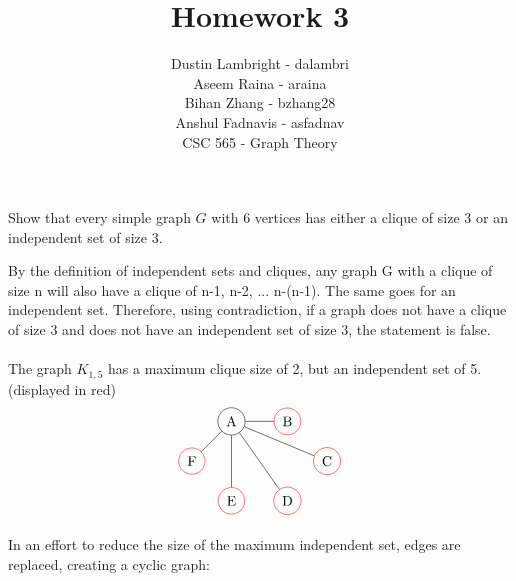 \documentclass[12pt]{article}
\newenvironment{question}[2][Question]{\begin{trivlist}
\item[\hskip \labelsep {\bfseries #1}\hskip \labelsep {\bfseries #2.}]}{\end{trivlist}}
\begin{document}


\title{Homework 3}%
\author{Dustin Lambright - dalambri \\ Aseem Raina - araina \\ Bihan Zhang - bzhang28 \\ Anshul Fadnavis - asfadnav\\
CSC 565 - Graph Theory} %

\maketitle


\begin{question}{1}
Show that every simple graph $G$ with 6 vertices has either a clique of size 3 or an independent
set of size 3.
\end{question}

By the definition of independent sets and cliques, any graph G with a clique of size n will also have a clique of n-1, n-2, ... n-(n-1).  The same goes for an independent set.  Therefore, using contradiction, if a graph does not have a clique of size 3 and does not have an independent set of size 3, the statement is false. \\ \\

The graph $K_{1,5}$ has a maximum clique size of 2, but an independent set of 5. (displayed in red)
\begin{align*}
\begin{tikzpicture}
\node[shape=circle,draw=black] (A) at (1,2) {A};
\node[shape=circle,draw=red] (B) at (2.4142857,2) {B};
\node[shape=circle,draw=red] (C) at (3.4142856,1) {C};
\node[shape=circle,draw=red] (D) at (2.4142857,0) {D};
\node[shape=circle,draw=red] (E) at (1,0) {E};
\node[shape=circle,draw=red] (F) at (0,1) {F};
\path [] (A) edge node[left] {} (B);
\path [] (A) edge node[left] {} (C);
\path [] (A) edge node[left] {} (D);
\path [] (A) edge node[left] {} (E);
\path [] (A) edge node[left] {} (F);
\end{tikzpicture}
\end{align*}

In an effort to reduce the size of the maximum independent set, edges are replaced, creating a cyclic graph: \\
\end{document}

